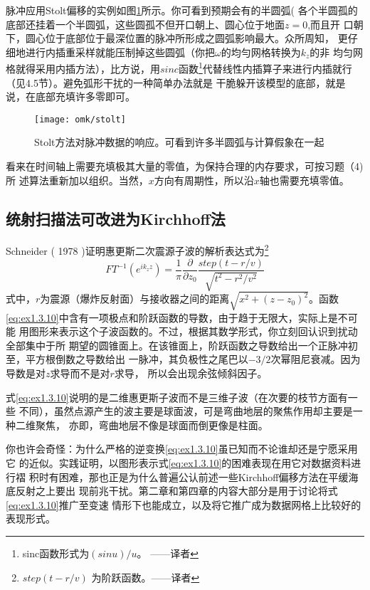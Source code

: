 脉冲应用Stolt偏移的实例如图\ref{fig:omk/stolt}所示。你可看到预期会有的半圆弧(
各个半圆孤的底部还挂着一个半圆弧，这些圆孤不但开口朝上、圆心位于地面$z=0$,而且开
口朝下，圆心位于底部位于最深位置的脉冲所形成之圆弧影响最大。众所周知，
更仔细地进行内插重采样就能压制掉这些圆弧（你把$\omega$的均勻网格转换为$k_z$的非
均匀网格就得采用内插方法），比方说，用$sinc$函数\footnote{sinc函数形式为$(sin u)/u$。
——译者}代替线性内插算子来进行内插就行（见4.5节）。避免弧形干扰的一种简单办法就是
干脆躲开该模型的底部，就是说，在底部充填许多零即可。
\begin{figure}[H]
\centering
\texttt{[image: omk/stolt]}
\caption[stolt]{Stolt方法对脉冲数据的响应。可看到许多半圆弧与计算假象在一起}
\label{fig:omk/stolt}
\end{figure}
看来在时间轴上需要充填极其大量的零值，为保持合理的内存要求，可按习题（4)所
述算法重新加以组织。当然，$x$方向有周期性，所以沿$x$轴也需要充填零值。

\subsection{统射扫描法可改进为Kirchhoff法}
Schneider ( 1978 )证明惠更斯二次震源子波的解析表达式为\footnote{$step(t-r/v)$
为阶跃函数。——译者}
\begin{equation}
FT^{-1}(e^{ik_zz})=\frac{1}{\pi}\frac{\partial}{\partial z_0}\frac{step(t-r/v)}{\sqrt{t^2-r^2/v^2}}
\label{eq:ex1.3.10}
\end{equation}
式中，$r$为震源（爆炸反射面）与接收器之间的距离$\sqrt{x^2+(z-z_0)^2}$。函数
\ref{eq:ex1.3.10}中含有一项极点和阶跃函数的导数，由于趋于无限大，实际上是不可能
用图形来表示这个子波函数的。不过，根据其数学形式，你立刻回认识到扰动全部集中于所
期望的圆锥面上。在该锥面上，阶跃函数之导数给出一个正脉冲初至，平方根倒数之导数给出
一脉冲，其负极性之尾巴以$-3/2$次幂阻尼衰减。因为导数是对$z$求导而不是对$r$求导，
所以会出现余弦倾斜因子。

式\ref{eq:ex1.3.10}说明的是二维惠更斯子波而不是三维子波（在次要的枝节方面有一些
不同），虽然点源产生的波主要是球面波，可是弯曲地层的聚焦作用却主要是一种二维聚焦，
亦即，弯曲地层不像是球面而倒更像是柱面。

你也许会奇怪：为什么严格的逆变换\ref{eq:ex1.3.10}虽已知而不论谁却还是宁愿采用它
的近似。实践证明，以图形表示式\ref{eq:ex1.3.10}的困难表现在用它对数据资料进行褶
积时有困难，那也正是为什么普遍公认前述一些Kirchhoff偏移方法在平缓海底反射之上要出
现前兆干扰。第二章和第四章的内容大部分是用于讨论将式\ref{eq:ex1.3.10}推广至变速
情形下也能成立，以及将它推广成为数据网格上比较好的表现形式。

